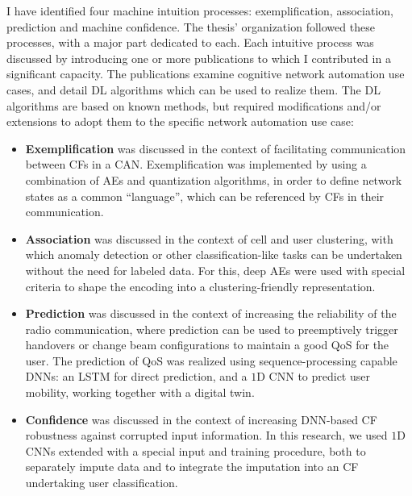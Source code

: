 	I have identified four machine intuition processes: exemplification, association, prediction and machine confidence.
	The thesis' organization followed these processes, with a major part dedicated to each.
	Each intuitive process was discussed by introducing one or more publications to which I contributed in a significant capacity.
	The publications examine cognitive network automation use cases, and detail \ac{DL} algorithms which can be used to realize them.
	The \ac{DL} algorithms are based on known methods, but required modifications and/or extensions to adopt them to the specific network automation use case:
	\begin{itemize}
		\item
			\textbf{Exemplification} was discussed in the context of facilitating communication between \acp{CF} in a \ac{CAN}.
			Exemplification was implemented by using a combination of \acp{AE} and quantization algorithms, in order to define network states as a common ``language'', which can be referenced by \acp{CF} in their communication.
			
		\item
			\textbf{Association} was discussed in the context of cell and user clustering, with which anomaly detection or other classification-like tasks can be undertaken without the need for labeled data.
			For this, deep \acp{AE} were used with special criteria to shape the encoding into a clustering-friendly representation.
			
		\item
			\textbf{Prediction} was discussed in the context of increasing the reliability of the radio communication, where prediction can be used to preemptively trigger handovers or change beam configurations to maintain a good \ac{QoS} for the user.
			The prediction of \ac{QoS} was realized using sequence-processing capable \acp{DNN}: an \ac{LSTM} for direct prediction, and a $1$D \ac{CNN} to predict user mobility, working together with a digital twin.
			
		\item
			\textbf{Confidence} was discussed in the context of increasing \ac{DNN}-based \ac{CF} robustness against corrupted input information.
			In this research, we used $1$D \acp{CNN} extended with a special input and training procedure, both to separately impute data and to integrate the imputation into an \ac{CF} undertaking user classification.
	\end{itemize}
	

